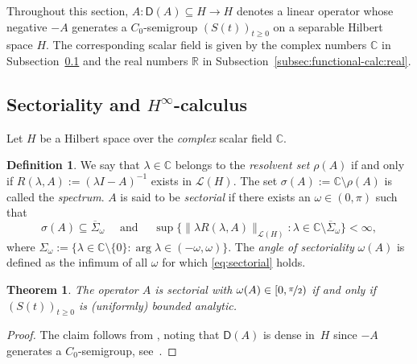 \documentclass[reqno]{amsart}
\numberwithin{equation}{section}
\newcommand{\R}{\mathbb{R}}
\newcommand{\C}{\mathbb{C}}
\newcommand{\norm}[2]{     \| #1       \|_{ #2 }}
\newcommand{\from}{\colon}
\newcommand{\clos}[1]{\overline{ #1 }}
\newtheorem{theorem}[lemma]{Theorem}
\theoremstyle{remark}
\theoremstyle{definition}
\newtheorem{definition}[lemma]{Definition}
\begin{document}
Throughout this section,
$A \from \mathsf D(A)\subseteq H \to H$ denotes a
linear operator whose negative $-A$ generates
a $C_0$-semigroup $(S(t))_{t\geq 0}$ on a 
separable Hilbert space $H$. 
The corresponding scalar field is given by the 
complex numbers $\C$ 
in Subsection~\ref{subsec:complex-func-calc} 
and the real numbers $\R$ 
in Subsection~\ref{subsec:functional-calc:real}. 

\subsection{Sectoriality and 
	\texorpdfstring{$H^\infty$-calculus}{H-infinity-calculus}}
\label{subsec:complex-func-calc}

Let $H$ be a Hilbert space 
over the \emph{complex} scalar field $\C$. 
%
\begin{definition}\label{def:sectorial}
	We say that $\lambda\in \C$ belongs to the 
	\emph{resolvent set} $\rho(A)$ if and only if
	$R(\lambda,A) := (\lambda I - A)^{-1}$ exists in $\mathscr L(H)$.
	The set $\sigma(A) := \C\setminus\rho(A)$ is called the \emph{spectrum}.
	$A$ is said to be \emph{sectorial} if there 
	exists an $\omega \in (0,\pi)$ such that
	\begin{equation}\label{eq:sectorial} 
	\sigma(A) 
	\subseteq 
	\clos \Sigma_\omega
	\quad 
	\text{ and } 
	\quad 
	\sup \{ 
	\norm{\lambda R(\lambda, A)}{\mathscr L(H)} 
	:
	\lambda \in \C\setminus\clos\Sigma_\omega
	\}
	< \infty, 
	\end{equation}
	where 
	$\Sigma_\omega:= \{\lambda\in\C\setminus \{0\}: \arg\lambda \in (-\omega,\omega)\}$. 
	The \emph{angle of sectoriality} $\omega(A)$ is defined as 
	the infimum of all $\omega$ for which \eqref{eq:sectorial} holds.
\end{definition}

\begin{theorem}\label{thm:sectoriality-analytic-semigroups}
	The operator $A$ is sectorial with $\omega(A)\in [0,\nicefrac{\pi}{2})$  
	if and only if
	$(S(t))_{t\ge0}$ is (uniformly) bounded analytic.
\end{theorem}

\begin{proof}
	The claim 
	follows from \cite[Theorem~G.5.2]{AnalysisInBanachSpacesII},
	noting that $\mathsf D(A)$ is dense in~$H$ 
	since $-A$ generates a $C_0$-semigroup,
	see~\cite[Theorem~II.1.4]{Engel1999}.
\end{proof}
\end{document}
